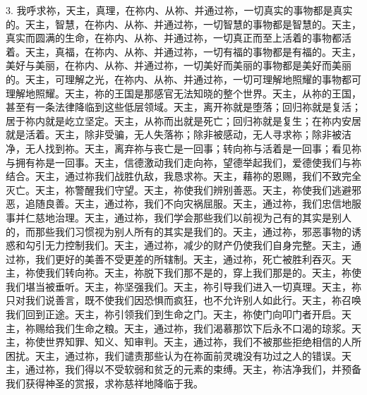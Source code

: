 3. 我呼求祢，天主，真理，在祢内、从祢、并通过祢，一切真实的事物都是真实的。天主，智慧，在祢内、从祢、并通过祢，一切智慧的事物都是智慧的。天主，真实而圆满的生命，在祢内、从祢、并通过祢，一切真正而至上活着的事物都活着。天主，真福，在祢内、从祢、并通过祢，一切有福的事物都是有福的。天主，美好与美丽，在祢内、从祢、并通过祢，一切美好而美丽的事物都是美好而美丽的。天主，可理解之光，在祢内、从祢、并通过祢，一切可理解地照耀的事物都可理解地照耀。天主，祢的王国是那感官无法知晓的整个世界。天主，从祢的王国，甚至有一条法律降临到这些低层领域。天主，离开祢就是堕落；回归祢就是复活；居于祢内就是屹立坚定。天主，从祢而出就是死亡；回归祢就是复生；在祢内安居就是活着。天主，除非受骗，无人失落祢；除非被感动，无人寻求祢；除非被洁净，无人找到祢。天主，离弃祢与丧亡是一回事；转向祢与活着是一回事；看见祢与拥有祢是一回事。天主，信德激动我们走向祢，望德举起我们，爱德使我们与祢结合。天主，通过祢我们战胜仇敌，我恳求祢。天主，藉祢的恩赐，我们不致完全灭亡。天主，祢警醒我们守望。天主，祢使我们辨别善恶。天主，祢使我们逃避邪恶，追随良善。天主，通过祢，我们不向灾祸屈服。天主，通过祢，我们忠信地服事并仁慈地治理。天主，通过祢，我们学会那些我们以前视为己有的其实是别人的，而那些我们习惯视为别人所有的其实是我们的。天主，通过祢，邪恶事物的诱惑和勾引无力控制我们。天主，通过祢，减少的财产仍使我们自身完整。天主，通过祢，我们更好的美善不受更差的所辖制。天主，通过祢，死亡被胜利吞灭。天主，祢使我们转向祢。天主，祢脱下我们那不是的，穿上我们那是的。天主，祢使我们堪当被垂听。天主，祢坚强我们。天主，祢引导我们进入一切真理。天主，祢只对我们说善言，既不使我们因恐惧而疯狂，也不允许别人如此行。天主，祢召唤我们回到正途。天主，祢引领我们到生命之门。天主，祢使门向叩门者开启。天主，祢赐给我们生命之粮。天主，通过祢，我们渴慕那饮下后永不口渴的琼浆。天主，祢使世界知罪、知义、知审判。天主，通过祢，我们不被那些拒绝相信的人所困扰。天主，通过祢，我们谴责那些认为在祢面前灵魂没有功过之人的错误。天主，通过祢，我们得以不受软弱和贫乏的元素的束缚。天主，祢洁净我们，并预备我们获得神圣的赏报，求祢慈祥地降临于我。\par

